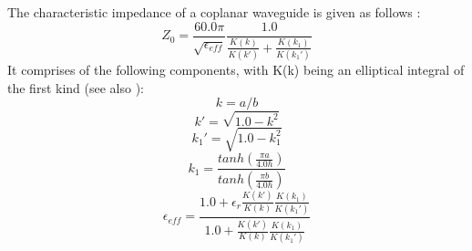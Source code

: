 The characteristic impedance of a coplanar waveguide is given as follows \cite{wadell}: 
\begin{equation}
	Z_0 = \frac{60.0 \pi}{\sqrt{\epsilon_{eff}}} \frac{1.0}{\frac{K(k)}{K(k')} + \frac{K(k_1)}{K(k_1')}}
\end{equation}
It comprises of the following components, with K(k) being an elliptical integral of the first kind (see also \cite[p.~430]{bronstein}):
\begin{equation}
	k = a/b
\end{equation}
\begin{equation}
	k' = \sqrt{1.0 - k^{2}}
\end{equation}
\begin{equation}
	k_1' = \sqrt{1.0 - k_1^{2}}
\end{equation}
\begin{equation}
	k_1 = \frac{tanh(\frac{\pi a}{4.0  h})}{tanh(\frac{\pi  b}{4.0 h})}
\end{equation}
\begin{equation}
	\epsilon_{eff} = \frac{1.0 + \epsilon_r \frac{K(k')}{K(k)} \frac{K(k_1)}{K(k_1')}}{1.0 + \frac{K(k')}{K(k)} \frac{K(k_1)}{K(k_1')}}
\end{equation}